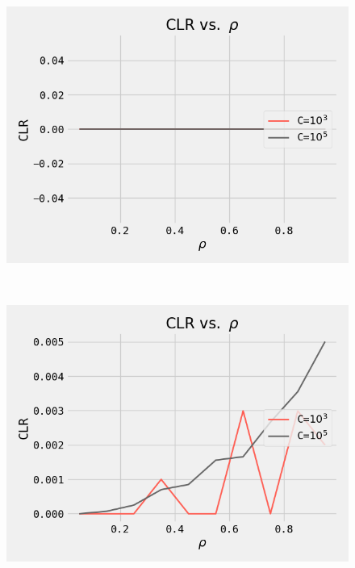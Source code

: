 \begin{figure}[ht!]
 \centering
 \begin{minipage}[]{0.48\linewidth}
  \centering
 \includegraphics[width=\linewidth]{Figures/task1_1.png}
 \label{fig1} 
 \end{minipage}~~~~\begin{minipage}  []{0.48\linewidth}
  \centering
  \includegraphics[width=\linewidth]{Figures/task1_2.png}
  \label{fig2}
 \end{minipage}
\end{figure}
